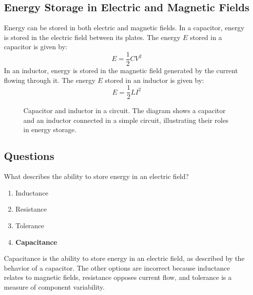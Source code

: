 \subsection*{Energy Storage in Electric and Magnetic Fields}
Energy can be stored in both electric and magnetic fields. In a capacitor, energy is stored in the electric field between its plates. The energy \( E \) stored in a capacitor is given by:
\begin{equation}
    E = \frac{1}{2}CV^2
\end{equation}
In an inductor, energy is stored in the magnetic field generated by the current flowing through it. The energy \( E \) stored in an inductor is given by:
\begin{equation}
    E = \frac{1}{2}LI^2
\end{equation}

\begin{figure}[h]
    \centering
    \caption{Capacitor and inductor in a circuit. The diagram shows a capacitor and an inductor connected in a simple circuit, illustrating their roles in energy storage.}
    \label{fig:capacitor_inductor}
\end{figure}

\subsection*{Questions}
\begin{tcolorbox}[colback=gray!10!white,colframe=black!75!black,title={T5C01}]
    What describes the ability to store energy in an electric field?
    \begin{enumerate}[label=\Alph*,noitemsep]
        \item Inductance
        \item Resistance
        \item Tolerance
        \item \textbf{Capacitance}
    \end{enumerate}
\end{tcolorbox}
Capacitance is the ability to store energy in an electric field, as described by the behavior of a capacitor. The other options are incorrect because inductance relates to magnetic fields, resistance opposes current flow, and tolerance is a measure of component variability.

